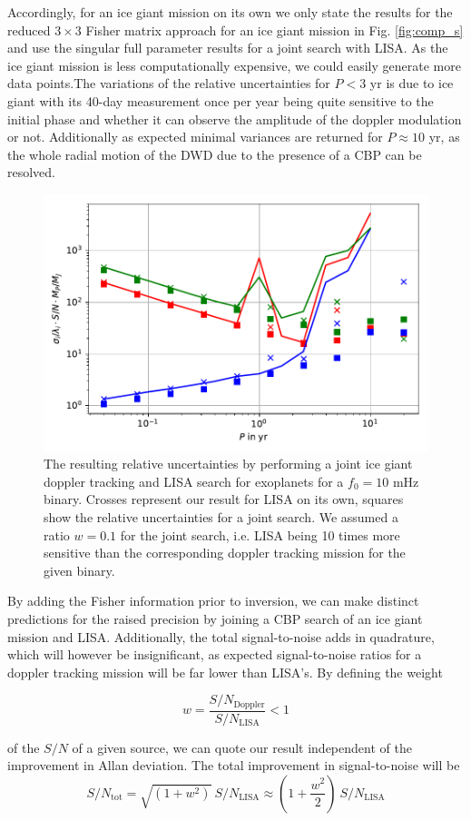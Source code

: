 \documentclass{aa}
\begin{document}
Accordingly, for an ice giant mission on its own we only state the results for the reduced $3\times 3$ Fisher matrix approach for an ice giant mission in Fig. \ref{fig:comp_s} and use the singular full parameter results for a joint search with LISA. As the ice giant mission is less computationally expensive, we could easily generate more data points.The variations of the relative uncertainties for $P<3$ yr is due to ice giant with its 40-day measurement once per year being quite sensitive to the initial phase and whether it can observe the amplitude of the doppler modulation or not. Additionally as expected minimal variances are returned for $P\approx 10$ yr, as the whole radial motion of the DWD due to the presence of a CBP can be resolved.

\begin{figure}
    \centering
    \includegraphics[width=.5\textwidth]{rel_uncertainty_added_10x.pdf}
    \caption{The resulting relative uncertainties by performing a joint ice giant doppler tracking and LISA search for exoplanets for a $f_0=10$ mHz binary. Crosses represent our result for LISA on its own, squares show the relative uncertainties for a joint search. We assumed a ratio $w=0.1$ for the joint search, i.e. LISA being 10 times more sensitive than the corresponding doppler tracking mission for the given binary.}
    \label{fig:joint}
\end{figure}

By adding the Fisher information prior to inversion, we can make distinct predictions for the raised precision by joining a CBP search of an ice giant mission and LISA. Additionally, the total signal-to-noise adds in quadrature, which will however be insignificant, as expected signal-to-noise ratios for a doppler tracking mission will be far lower than LISA's. By defining the weight

\begin{equation}
    w=\frac{S/N_\mathrm{Doppler}}{S/N_\mathrm{LISA}} < 1
\end{equation}

of the $S/N$ of a given source, we can quote our result independent of the improvement in Allan deviation. The total improvement in signal-to-noise will be 
\begin{equation}
    S/N_\mathrm{tot}=\sqrt{(1+w^2)}\ S/N_\mathrm{LISA}\approx \left(1+\frac{w^2}{2}\right)\ S/N_\mathrm{LISA}
\end{equation}
\end{document}
